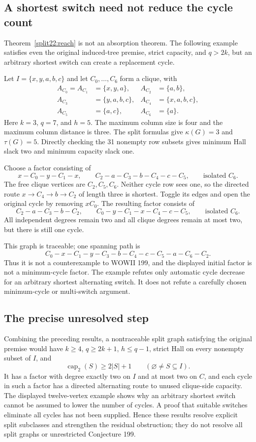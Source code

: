 \documentclass[11pt,a4paper]{article}
\theoremstyle{definition}\newtheorem{definition}[theorem]{Definition}
\theoremstyle{remark}\newtheorem{remark}[theorem]{Remark}
\begin{document}
\subsection{A shortest switch need not reduce the cycle count}

Theorem~\ref{split22:reach} is not an absorption theorem. The following example
satisfies even the original induced-tree premise, strict capacity, and
$q>2k$, but an arbitrary shortest switch can create a replacement cycle.

Let $I=\{x,y,a,b,c\}$ and let $C_0,\ldots,C_6$ form a clique, with
\begin{align*}
 A_{C_0}=A_{C_1}&=\{x,y,a\}, & A_{C_2}&=\{a,b\},\\
 A_{C_3}&=\{y,a,b,c\}, & A_{C_4}&=\{x,a,b,c\},\\
 A_{C_5}&=\{a,c\}, & A_{C_6}&=\{a\}.
\end{align*}
Here $k=3$, $q=7$, and $h=5$. The maximum column size is four and the
maximum column distance is three. The split formulas give
$\kappa(G)=3$ and $\tau(G)=5$. Directly checking the 31 nonempty row
subsets gives minimum Hall slack two and minimum capacity slack one.

Choose a factor consisting of
\[
 x-C_0-y-C_1-x,
 \qquad C_2-a-C_3-b-C_4-c-C_5,
 \qquad\text{isolated }C_6.
\]
The free clique vertices are $C_2,C_5,C_6$. Neither cycle row sees one,
so the directed route $x\to C_4\to b\to C_2$ of length three is shortest.
Toggle its edges and open the original cycle by removing $xC_0$.
The resulting factor consists of
\[
 C_2-a-C_3-b-C_2,
 \qquad C_0-y-C_1-x-C_4-c-C_5,
 \qquad\text{isolated }C_6.
\]
All independent degrees remain two and all clique degrees remain at most
two, but there is still one cycle.

This graph is traceable; one spanning path is
\[
 C_0-x-C_1-y-C_3-b-C_4-c-C_5-a-C_6-C_2.
\]
Thus it is not a counterexample to WOWII 199, and the displayed initial
factor is not a minimum-cycle factor. The example refutes only automatic
cycle decrease for an arbitrary shortest alternating switch. It does not
refute a carefully chosen minimum-cycle or multi-switch argument.



\subsection{The precise unresolved step}
Combining the preceding results, a nontraceable split graph satisfying
the original premise would have $k\ge4$, $q\ge2k+1$, $h\le q-1$,
strict Hall on every nonempty subset of $I$, and
\[
 \operatorname{cap}_2(S)\ge2|S|+1
 \qquad(\varnothing\ne S\subseteq I).
\]
It has a factor with degree exactly two on $I$ and at most two on $C$,
and each cycle in such a factor has a directed alternating route to
unused clique-side capacity. The displayed twelve-vertex example
shows why an arbitrary shortest switch cannot be assumed to lower the
number of cycles. A proof that suitable switches eliminate all cycles
has not been supplied. Hence these results resolve explicit split
subclasses and strengthen the residual obstruction; they do not resolve
all split graphs or unrestricted Conjecture 199.
\end{document}
